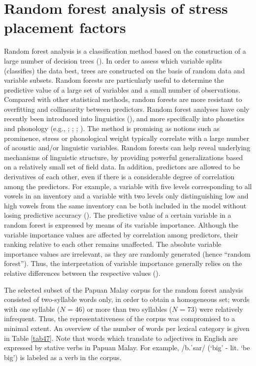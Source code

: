 \section{Random forest analysis of stress placement factors} \label{sec43}
Random forest analysis is a classification method based on the construction of a large number of decision trees (\citealt{breiman_random_2001}). In order to assess which variable splits (classifies) the data best, trees are constructed on the basis of random data and variable subsets. Random forests are particularly useful to determine the predictive value of a large set of variables and a small number of observations. Compared with other statistical methods, random forests are more resistant to overfitting and collinearity between predictors. Random forest analyses have only recently been introduced into linguistics (\citealt{tagliamonte_models_2012}), and more specifically into phonetics and phonology (e.g., \citealt{arnold_using_2013}; \citealt{baumann_what_2018}; \citealt{grafmiller_new_2011}; \citealt{grice_tune_2015}). The method is promising as notions such as prominence, stress or phonological weight typically correlate with a large number of acoustic and/or linguistic variables. Random forests can help reveal underlying mechanisms of linguistic structure, by providing powerful generalizations based on a relatively small set of field data. In addition, predictors are allowed to be derivatives of each other, even if there is a considerable degree of correlation among the predictors. For example, a variable with five levels corresponding to all vowels in an inventory and a variable with two levels only distinguishing low and high vowels from the same inventory can be both included in the model without losing predictive accuracy (\citealt{strobl_conditional_2008}). The predictive value of a certain variable in a random forest is expressed by means of its variable importance. Although the variable importance values are affected by correlation among predictors, their ranking relative to each other remains unaffected. The absolute variable importance values are irrelevant, as they are randomly generated (hence ``random forest''). Thus, the interpretation of variable importance generally relies on the relative differences between the respective values (\citealt{shih_random_2013}).\par

The selected subset of the Papuan Malay corpus for the random forest analysis consisted of two-syllable words only, in order to obtain a homogeneous set; words with one syllable ($N$ = 46) or more than two syllables ($N$ = 73) were relatively infrequent. Thus, the representativeness of the corpus was compromised to a minimal extent. An overview of the number of words per lexical category is given in Table \ref{tab47}. Note that words which translate to adjectives in English are expressed by stative verbs in Papuan Malay. For example, /b.ˈsar/ (`big' - lit. `be big') is labeled as a verb in the corpus.

